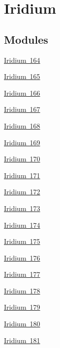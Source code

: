 \hypertarget{group___isotope_const-_iridium}{}\section{Iridium}
\label{group___isotope_const-_iridium}
\subsection*{Modules}
\begin{DoxyCompactItemize}
\item 
\mbox{\hyperlink{group___isotope_const-_iridium-_ir164}{Iridium 164}}
\item 
\mbox{\hyperlink{group___isotope_const-_iridium-_ir165}{Iridium 165}}
\item 
\mbox{\hyperlink{group___isotope_const-_iridium-_ir166}{Iridium 166}}
\item 
\mbox{\hyperlink{group___isotope_const-_iridium-_ir167}{Iridium 167}}
\item 
\mbox{\hyperlink{group___isotope_const-_iridium-_ir168}{Iridium 168}}
\item 
\mbox{\hyperlink{group___isotope_const-_iridium-_ir169}{Iridium 169}}
\item 
\mbox{\hyperlink{group___isotope_const-_iridium-_ir170}{Iridium 170}}
\item 
\mbox{\hyperlink{group___isotope_const-_iridium-_ir171}{Iridium 171}}
\item 
\mbox{\hyperlink{group___isotope_const-_iridium-_ir172}{Iridium 172}}
\item 
\mbox{\hyperlink{group___isotope_const-_iridium-_ir173}{Iridium 173}}
\item 
\mbox{\hyperlink{group___isotope_const-_iridium-_ir174}{Iridium 174}}
\item 
\mbox{\hyperlink{group___isotope_const-_iridium-_ir175}{Iridium 175}}
\item 
\mbox{\hyperlink{group___isotope_const-_iridium-_ir176}{Iridium 176}}
\item 
\mbox{\hyperlink{group___isotope_const-_iridium-_ir177}{Iridium 177}}
\item 
\mbox{\hyperlink{group___isotope_const-_iridium-_ir178}{Iridium 178}}
\item 
\mbox{\hyperlink{group___isotope_const-_iridium-_ir179}{Iridium 179}}
\item 
\mbox{\hyperlink{group___isotope_const-_iridium-_ir180}{Iridium 180}}
\item 
\mbox{\hyperlink{group___isotope_const-_iridium-_ir181}{Iridium 181}}

\end{DoxyCompactItemize}
